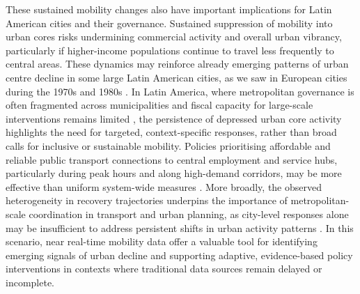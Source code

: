 \documentclass[fleqn,10pt]{wlscirep}
\begin{document}
These sustained mobility changes also have important implications for Latin American cities and their governance. Sustained suppression of mobility into urban cores risks undermining commercial activity and overall urban vibrancy, particularly if higher-income populations continue to travel less frequently to central areas. These dynamics may reinforce already emerging patterns of urban centre decline in some large Latin American cities, as we saw in European cities during the 1970s and 1980s \cite{THORSTEN}. In Latin America, where metropolitan governance is often fragmented across municipalities and fiscal capacity for large-scale interventions remains limited \cite{un2022world, inostroza2013urban, fay2017rethinking, irazabal20governance}, the persistence of depressed urban core activity highlights the need for targeted, context-specific responses, rather than broad calls for inclusive or sustainable mobility. Policies prioritising affordable and reliable public transport connections to central employment and service hubs, particularly during peak hours and along high-demand corridors, may be more effective than uniform system-wide measures \cite{rivas2019urban, guzman2022effects}. More broadly, the observed heterogeneity in recovery trajectories underpins the importance of metropolitan-scale coordination in transport and urban planning, as city-level responses alone may be insufficient to address persistent shifts in urban activity patterns \cite{duque2021institutional}. In this scenario, near real-time mobility data offer a valuable tool for identifying emerging signals of urban decline and supporting adaptive, evidence-based policy interventions in contexts where traditional data sources remain delayed or incomplete.


\end{document}
